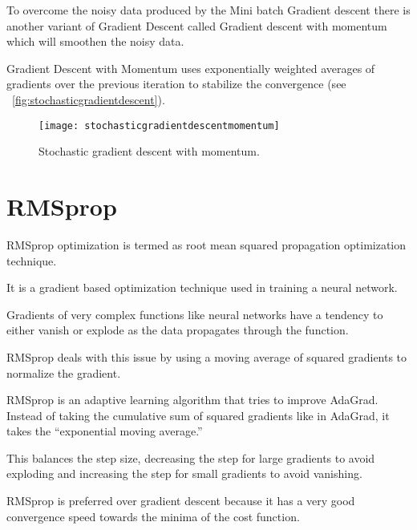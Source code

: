 	\begin{bulletedlist}
		\item To overcome the noisy data produced by the Mini batch Gradient descent there is another variant of Gradient Descent called Gradient descent with momentum which will smoothen the noisy data.
		\item Gradient Descent with Momentum uses exponentially weighted averages of gradients over the previous iteration to stabilize the convergence (see \figurename~\ref{fig:stochasticgradientdescent}).
	\end{bulletedlist}
 	\begin{figure}[h]
		\centering
		\texttt{[image: stochasticgradientdescentmomentum]}
		\caption[Stochastic gradient descent with momentum]{Stochastic gradient descent with momentum.}
		\label{fig:stochasticgradientdescentmomentum}
	\end{figure}


	\section{RMSprop}

	\begin{bulletedlist}
		\item RMSprop optimization is termed as root mean squared propagation optimization technique.
		\item It is a gradient based optimization technique used in training a neural network.
		\item Gradients of very complex functions like neural networks have a tendency to either vanish or explode as the data propagates through the function.
		\item RMSprop deals with this issue by using a moving average of squared gradients to normalize the gradient.
		\item RMSprop is an adaptive learning algorithm that tries to improve AdaGrad. Instead of taking the cumulative sum of squared gradients like in AdaGrad, it takes the ``exponential moving average.''
		\item This balances the step size, decreasing the step for large gradients to avoid exploding and increasing the step for small gradients to avoid vanishing.
		\item RMSprop is preferred over gradient descent because it has a very good convergence speed towards the minima of the cost function.
	\end{bulletedlist}

